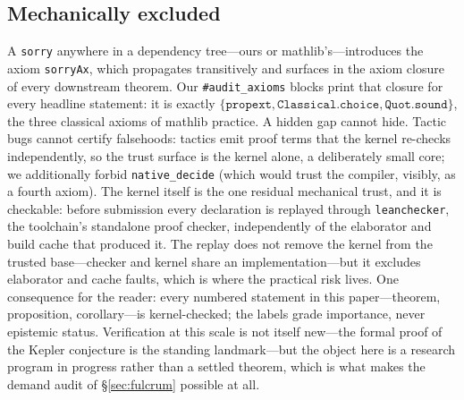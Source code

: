\documentclass{CUP-JNL-FMP}
\theoremstyle{remark}
\begin{document}
\subsection{Mechanically excluded}
A \texttt{sorry} anywhere in a dependency tree---ours or
\textsf{mathlib}'s---introduces the axiom \texttt{sorryAx}, which
propagates transitively and surfaces in the axiom closure of every
downstream theorem. Our \texttt{\#audit\_axioms} blocks print that closure
for every headline statement: it is exactly
$\{\texttt{propext}, \texttt{Classical.choice}, \texttt{Quot.sound}\}$,
the three classical axioms of \textsf{mathlib} practice. A hidden gap
cannot hide. Tactic bugs cannot certify falsehoods: tactics emit proof
terms that the kernel re-checks independently, so the trust surface is the
kernel alone, a deliberately small core; we additionally forbid
\texttt{native\_decide} (which would trust the compiler, visibly, as a
fourth axiom). The kernel itself is the one residual mechanical trust,
and it is checkable: before submission every declaration is replayed
through \texttt{leanchecker}, the toolchain's standalone proof checker,
independently of the elaborator and build cache that produced it. The
replay does not remove the kernel from the trusted base---checker and
kernel share an implementation---but it excludes elaborator and cache
faults, which is where the practical risk lives. One consequence for the reader: every
numbered statement in this paper---theorem, proposition,
corollary---is kernel-checked; the labels grade importance, never
epistemic status. Verification at this scale is not itself new---the
formal proof of the Kepler conjecture \cite{HalesKepler} is the standing
landmark---but the object here is a research program in progress rather
than a settled theorem, which is what makes the demand audit of
\S\ref{sec:fulcrum} possible at all.
\end{document}
